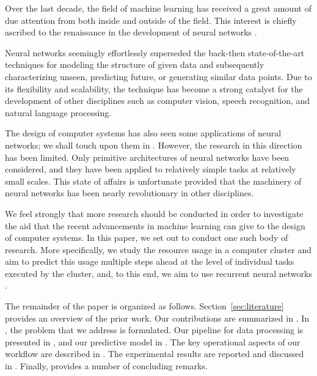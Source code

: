 Over the last decade, the field of machine learning has received a great amount
of due attention from both inside and outside of the field. This interest is
chiefly ascribed to the renaissance in the development of neural networks
\cite{goodfellow2016}.

Neural networks seemingly effortlessly superseded the back-then state-of-the-art
techniques for modeling the structure of given data and subsequently
characterizing unseen, predicting future, or generating similar data points. Due
to its flexibility and scalability, the technique has become a strong catalyst
for the development of other disciplines such as computer vision, speech
recognition, and natural language processing.

The design of computer systems has also seen some applications of neural
networks; we shall touch upon them in . However, the research
in this direction has been limited. Only primitive architectures of neural
networks have been considered, and they have been applied to relatively simple
tasks at relatively small scales. This state of affairs is unfortunate provided
that the machinery of neural networks has been nearly revolutionary in other
disciplines.

We feel strongly that more research should be conducted in order to investigate
the aid that the recent advancements in machine learning can give to the design
of computer systems. In this paper, we set out to conduct one such body of
research. More specifically, we study the resource usage in a computer cluster
and aim to predict this usage multiple steps ahead at the level of individual
tasks executed by the cluster, and, to this end, we aim to use recurrent neural
networks \cite{goodfellow2016}.

The remainder of the paper is organized as follows. Section~\ref{sec:literature}
provides an overview of the prior work. Our contributions are summarized in
. In , the problem that we address is
formulated. Our pipeline for data processing is presented in , and
our predictive model in . The key operational aspects of our
workflow are described in . The experimental results are
reported and discussed in . Finally,  provides a
number of concluding remarks.
